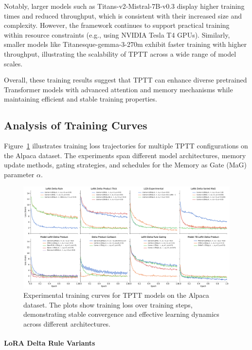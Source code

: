 \documentclass[10pt,a4paper]{article}
\begin{document}
Notably, larger models such as Titans-v2-Mistral-7B-v0.3 display higher training times and reduced throughput, which is consistent with their increased size and complexity. However, the framework continues to support practical training within resource constraints (e.g., using NVIDIA Tesla T4 GPUs). Similarly, smaller models like Titanesque-gemma-3-270m exhibit faster training with higher throughput, illustrating the scalability of TPTT across a wide range of model scales.

Overall, these training results suggest that TPTT can enhance diverse pretrained Transformer models with advanced attention and memory mechanisms while maintaining efficient and stable training properties.


\subsection{Analysis of Training Curves}

Figure~\ref{fig:training_curve} illustrates training loss trajectories for multiple TPTT configurations on the Alpaca dataset. The experiments span different model architectures, memory update methods, gating strategies, and schedules for the Memory as Gate (MaG) parameter \(\alpha\).


\begin{figure}[ht]
    \centering
    \includegraphics[width=1.0\linewidth]{plot.pdf}
    \caption{Experimental training curves for TPTT models on the Alpaca dataset. The plots show training loss over training steps, demonstrating stable convergence and effective learning dynamics across different architectures.}
    \label{fig:training_curve}
\end{figure}


\paragraph{LoRA Delta Rule Variants}
\end{document}
